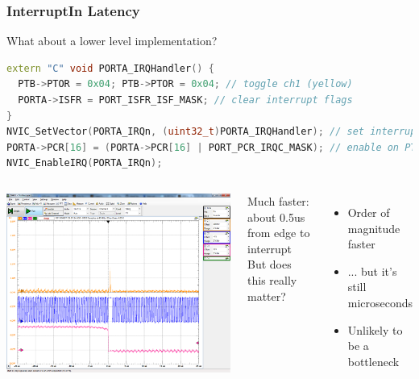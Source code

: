 \documentclass{beamer}
\begin{document}
\begin{frame}[fragile]
\frametitle{InterruptIn Latency}
What about a lower level implementation?
\vspace{2px}
\begin{lstlisting}[language=C++,basicstyle=\ttfamily\tiny]
extern "C" void PORTA_IRQHandler() {
  PTB->PTOR = 0x04; PTB->PTOR = 0x04; // toggle ch1 (yellow)
  PORTA->ISFR = PORT_ISFR_ISF_MASK; // clear interrupt flags
}
NVIC_SetVector(PORTA_IRQn, (uint32_t)PORTA_IRQHandler); // set interrupt handler function
PORTA->PCR[16] = (PORTA->PCR[16] | PORT_PCR_IRQC_MASK); // enable on PTC16 / ch3 (pink)
NVIC_EnableIRQ(PORTA_IRQn);
\end{lstlisting}
\begin{columns}[T]
\includegraphics[width=1.0\columnwidth]{images-dis10/irq_raw_latency}

Much faster: about 0.5us from edge to interrupt \\
\vspace{20px}
But does this really matter?
{\scriptsize
\begin{itemize}
  \item Order of magnitude faster
  \item ... but it's still microseconds
  \item Unlikely to be a bottleneck
\end{itemize}
}
\end{columns}
\end{frame}
\end{document}
